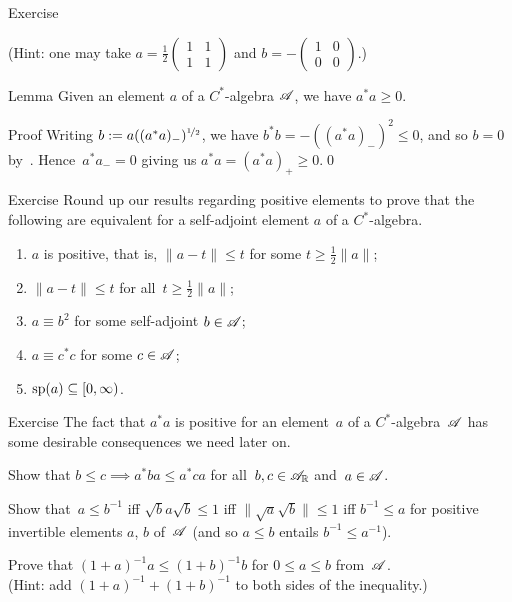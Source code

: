 \documentclass[main]{subfiles}
\begin{document}
\begin{parsec}
\begin{point}{Exercise}
\begin{enumerate}
(Hint: one may take  
$a=\frac{1}{2}\left(\begin{smallmatrix}1 & 1 \\ 1 & 1\end{smallmatrix}\right)$
and $b=-\left(\begin{smallmatrix}1 & 0 \\ 0 & 0 \end{smallmatrix}\right)$.)
\end{enumerate}
\end{point}
\begin{point}{Lemma}%
Given an element $a$ of a $C^*$-algebra $\mathscr{A}$,
we have $a^*a\geq 0$.
\begin{point}{Proof}%
Writing $b:=a((a^*a)_-)^{\nicefrac{1}{2}}$,
we have $b^*b=-((a^*a)_-)^2\leq 0$,
and so $b=0$ by~.
Hence~$a^*a_-=0$ giving us $a^*a=(a^*a)_+\geq 0$.\qed
\end{point}
\end{point}
\begin{point}{Exercise}%
Round up our results regarding positive elements
to 
prove that
the following are equivalent
for a self-adjoint element $a$ of a $C^*$-algebra.
\begin{enumerate}
\item 
$a$ is positive, that is,  $\|a-t\|\leq t$
for some $t\geq \frac{1}{2}\|a\|$;
\item
$\|a-t\|\leq t$ for all~$t\geq \frac{1}{2}\|a\|$;
\item
$a\equiv b^2$ for some self-adjoint $b\in\mathscr{A}$;
\item
$a\equiv c^* c$ for some $c\in\mathscr{A}$;
\item
$\mathrm{sp}(a)\subseteq [0,\infty)$.
\end{enumerate}
\end{point}
\begin{point}{Exercise}%
The fact that $a^*a$ is positive
for an element~$a$ of a $C^*$-algebra~$\mathscr{A}$
has some desirable consequences
we need later on.
\begin{point}%
Show that $b\leq c\implies a^*ba \leq a^*ca$
for all~$b,c\in\mathscr{A}_{\mathbb{R}}$ and~$a\in\mathscr{A}$.
\end{point}
\begin{point}%
Show that~$a\leq b^{-1}$ 
iff $\sqrt{b}a\sqrt{b}\leq 1$
iff $\|\sqrt{a}\sqrt{b}\|\leq 1$
iff $b^{-1}\leq a$
for positive invertible elements $a$, $b$ of~$\mathscr{A}$
(and so $a\leq b$ entails $b^{-1}\leq a^{-1}$).
\end{point}
\begin{point}%
Prove that $(1+a)^{-1}a\leq (1+b)^{-1}b$
for $0\leq a\leq b$ from~$\mathscr{A}$.\\
(Hint: add $(1+a)^{-1} + (1+b)^{-1}$
to both sides of the inequality.)
\end{point}
\end{point}
\end{parsec}
\end{document}
